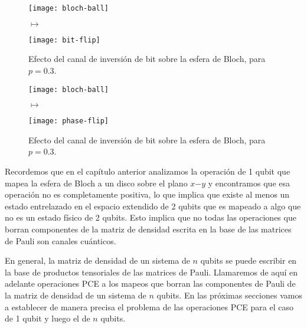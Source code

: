 \begin{figure}
\centering
\begin{minipage}{.4\textwidth}
    \centering
    \texttt{[image: bloch-ball]}
\end{minipage}
$\longmapsto$
\begin{minipage}{0.4\textwidth}
    \centering
    \texttt{[image: bit-flip]}
\end{minipage}
\caption{
Efecto del canal de inversión de bit sobre la esfera de Bloch, para $p=0.3$.}
\label{fig:bit-flip}
\end{figure}

\begin{figure}
\centering
\begin{minipage}{.4\textwidth}
    \centering
    \texttt{[image: bloch-ball]}
\end{minipage}
$\longmapsto$
\begin{minipage}{0.4\textwidth}
    \centering
    \texttt{[image: phase-flip]}
\end{minipage}
\caption{
Efecto del canal de inversión de bit sobre la esfera de Bloch, para $p=0.3$.}
\label{fig:phase-flip}
\end{figure}

Recordemos que en el capítulo anterior analizamos la operación de 
1 qubit que mapea la esfera de Bloch a un disco sobre el plano 
$x$$-$$y$ y encontramos que esa operación no es completamente 
positiva, lo que implica que existe al menos un estado entrelazado en 
el espacio extendido de 2 qubits que es mapeado a algo que no es
un estado físico de 2 qubits. Esto implica que no todas 
las operaciones que borran componentes de la matriz de 
densidad escrita en la base de las matrices de Pauli son canales cuánticos.

En general, la matriz de densidad de un sistema de $n$ qubits 
se puede escribir en la base de productos tensoriales de las matrices 
de Pauli. Llamaremos de aquí en adelante operaciones PCE a los 
mapeos que borran las componentes de Pauli de la matriz de densidad
de un sistema de $n$ qubits. En las próximas secciones vamos a
establecer de manera precisa el problema de las operaciones PCE 
para el caso de 1 qubit y luego el de $n$ qubits.



